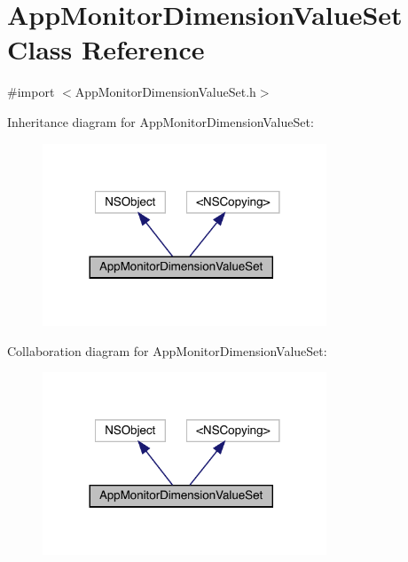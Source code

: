 \hypertarget{interface_app_monitor_dimension_value_set}{}\section{App\+Monitor\+Dimension\+Value\+Set Class Reference}
\label{interface_app_monitor_dimension_value_set}


{\ttfamily \#import $<$App\+Monitor\+Dimension\+Value\+Set.\+h$>$}



Inheritance diagram for App\+Monitor\+Dimension\+Value\+Set\+:\nopagebreak
\begin{figure}[H]
\begin{center}
\leavevmode
\includegraphics[width=240pt]{interface_app_monitor_dimension_value_set__inherit__graph}
\end{center}
\end{figure}


Collaboration diagram for App\+Monitor\+Dimension\+Value\+Set\+:\nopagebreak
\begin{figure}[H]
\begin{center}
\leavevmode
\includegraphics[width=240pt]{interface_app_monitor_dimension_value_set__coll__graph}
\end{center}
\end{figure}
